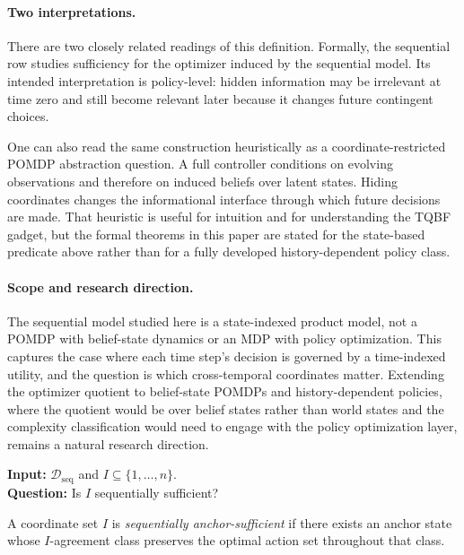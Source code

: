 \paragraph{Two interpretations.}
There are two closely related readings of this definition. Formally, the sequential row studies sufficiency for the optimizer induced by the sequential model. Its intended interpretation is policy-level: hidden information may be irrelevant at time zero and still become relevant later because it changes future contingent choices.

One can also read the same construction heuristically as a coordinate-restricted POMDP abstraction question. A full controller conditions on evolving observations and therefore on induced beliefs over latent states. Hiding coordinates changes the informational interface through which future decisions are made. That heuristic is useful for intuition and for understanding the TQBF gadget, but the formal theorems in this paper are stated for the state-based predicate above rather than for a fully developed history-dependent policy class.

\paragraph{Scope and research direction.}
The sequential model studied here is a state-indexed product model, not a POMDP with belief-state dynamics or an MDP with policy optimization. This captures the case where each time step's decision is governed by a time-indexed utility, and the question is which cross-temporal coordinates matter. Extending the optimizer quotient to belief-state POMDPs and history-dependent policies, where the quotient would be over belief states rather than world states and the complexity classification would need to engage with the policy optimization layer, remains a natural research direction.

\begin{problem}\label{prob:sequential-sufficiency}
\textbf{Input:} $\mathcal{D}_{\mathrm{seq}}$ and $I\subseteq\{1,\ldots,n\}$. \\
\textbf{Question:} Is $I$ sequentially sufficient?
\end{problem}

\begin{definition}\label{def:sequential-anchor-sufficient}
A coordinate set $I$ is \emph{sequentially anchor-sufficient} if there exists an anchor state whose $I$-agreement class preserves the optimal action set throughout that class.
\end{definition}

